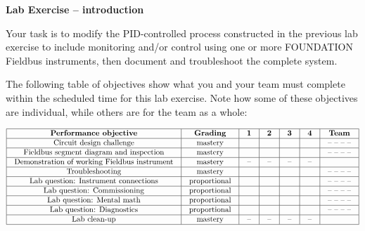 

\noindent
{\bf Lab Exercise -- introduction}

\vskip 5pt

Your task is to modify the PID-controlled process constructed in the previous lab exercise to include monitoring and/or control using one or more FOUNDATION Fieldbus instruments, then document and troubleshoot the complete system.

The following table of objectives show what you and your team must complete within the scheduled time for this lab exercise.  Note how some of these objectives are individual, while others are for the team as a whole:



$$\vbox{\offinterlineskip
\halign{\strut
\vrule \quad\hfil # \ \hfil & 
\vrule \quad\hfil # \ \hfil & 
\vrule \quad\hfil # \ \hfil & 
\vrule \quad\hfil # \ \hfil & 
\vrule \quad\hfil # \ \hfil & 
\vrule \quad\hfil # \ \hfil & 
\vrule \quad\hfil # \ \hfil \vrule \cr
\noalign{\hrule}
%
{\bf Performance objective} & {\bf Grading} & {\bf 1} & {\bf 2} & {\bf 3} & {\bf 4} & {\bf Team} \cr
%
\noalign{\hrule}
%
Circuit design challenge & mastery & & & & & -- -- -- -- \cr
%
\noalign{\hrule}
%
Fieldbus segment diagram and inspection & mastery & & & & & -- -- -- -- \cr
%
\noalign{\hrule}
%
Demonstration of working Fieldbus instrument & mastery & -- & -- & -- & -- & \cr
%
\noalign{\hrule}
%
Troubleshooting & mastery & & & & & -- -- -- -- \cr
%
\noalign{\hrule}
%
Lab question: Instrument connections & proportional &  &  &  &  & -- -- -- -- \cr
%
\noalign{\hrule}
%
Lab question: Commissioning & proportional &  &  &  &  & -- -- -- -- \cr
%
\noalign{\hrule}
%
Lab question: Mental math & proportional &  &  &  &  & -- -- -- -- \cr
%
\noalign{\hrule}
%
Lab question: Diagnostics & proportional &  &  &  &  & -- -- -- -- \cr
%
\noalign{\hrule}
%
Lab clean-up & mastery & -- & -- & -- & -- &  \cr
%
\noalign{\hrule}
} %
}$$ %

